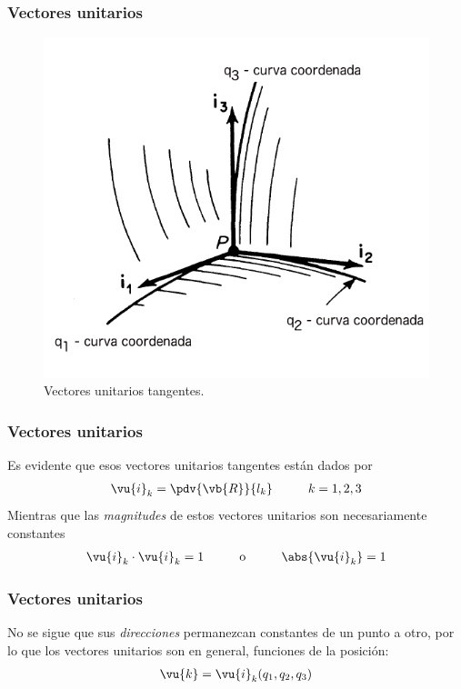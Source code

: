 \begin{frame}
\frametitle{Vectores unitarios}
\begin{figure}[H]
    \centering
    \includegraphics[scale=0.3]{Imagenes/CoordenadasCurvilineas_02.png}
    \caption{Vectores unitarios tangentes.}
    \label{fig:figura_A_02}
\end{figure}
\end{frame}
\begin{frame}
\frametitle{Vectores unitarios}
Es evidente que esos vectores unitarios tangentes están dados por
\begin{align}
\vu{i}_{k} = \pdv{\vb{R}}{l_{k}} \hspace{1cm} k = 1, 2, 3
\label{eq:ecuacion_A_01_05}    
\end{align}
\pause
Mientras que las \emph{magnitudes} de estos vectores unitarios son necesariamente constantes
\begin{align}
\vu{i}_{k} \cdot \vu{i}_{k} =  1 \hspace{1cm} \mbox{o} \hspace{1cm} \abs{\vu{i}_{k}} = 1
\label{eq:ecuacion_A_01_06}
\end{align}
\end{frame}
\begin{frame}
\frametitle{Vectores unitarios}
No se sigue que sus \emph{direcciones} permanezcan constantes de un punto a otro, por lo que los vectores unitarios son en general, funciones de la posición:
\begin{align*}
\vu{k} = \vu{i}_{k} (q_{1}, q_{2}, q_{3})
\end{align*}
\end{frame}
